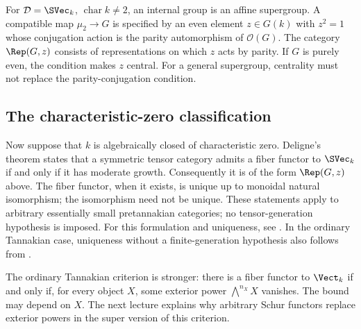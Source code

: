 \begin{example}
For $\mathcal D=\SVec_k$, $\operatorname{char}k\ne2$, an internal
group is an affine supergroup. A compatible map $\mu_2\to G$ is
specified by an even element $z\in G(k)$ with $z^2=1$ whose conjugation
action is the parity automorphism of $\mathcal O(G)$. The category
$\Rep(G,z)$ consists of representations on which $z$ acts by parity.
If $G$ is purely even, the condition makes $z$ central. For a general
supergroup, centrality must not replace the parity-conjugation condition.
\end{example}

\subsection{The characteristic-zero classification}

Now suppose that $k$ is algebraically closed of characteristic zero.
Deligne's theorem states that a symmetric tensor category admits a
fiber functor to $\SVec_k$ if and only if it has moderate growth.
Consequently it is of the form $\Rep(G,z)$ above. The fiber functor,
when it exists, is unique up to monoidal natural isomorphism; the
isomorphism need not be unique. These statements apply to arbitrary
essentially small pretannakian categories; no tensor-generation
hypothesis is imposed. For this formulation and uniqueness, see
\cite[\S\S1.1, 1.5]{CEOIncompressible}. In the ordinary Tannakian case,
uniqueness without a finite-generation hypothesis also follows from
\cite[Corollary 1.2]{WibmerTorsors}.

The ordinary Tannakian criterion is stronger: there is a fiber functor
to $\Vect_k$ if and only if, for every object $X$, some exterior power
$\bigwedge^{n_X}X$ vanishes. The bound may depend on $X$. The next
lecture explains why arbitrary Schur functors replace exterior powers
in the super version of this criterion.
